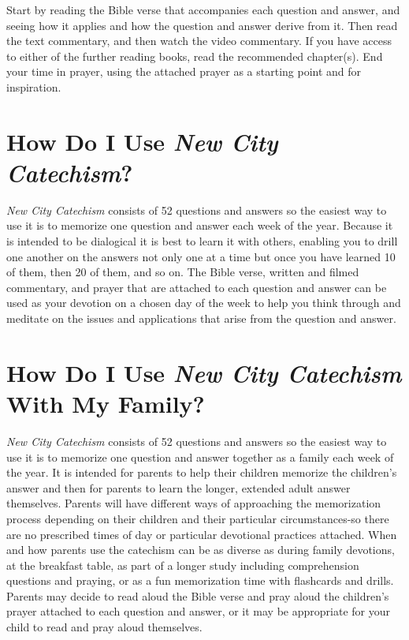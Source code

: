 Start by reading the Bible verse that accompanies each question and answer, and seeing how it applies and how the question and answer derive from it. Then read the text commentary, and then watch the video commentary. If you have access to either of the further reading books, read the recommended chapter(s). End your time in prayer, using the attached prayer as a starting point and for inspiration.

\section[How Do I Use {\em New City Catechism}?][Using the {\em Catechism}]{How Do I Use {\em New City Catechism}?}

\emph{New City Catechism}\/ consists of 52 questions and answers so the easiest way to use it is to memorize one question and answer each week of the year. Because it is intended to be dialogical it is best to learn it with others, enabling you to drill one another on the answers not only one at a time but once you have learned 10 of them, then 20 of them, and so on. The Bible verse, written and filmed commentary, and prayer that are attached to each question and answer can be used as your devotion on a chosen day of the week to help you think through and meditate on the issues and applications that arise from the question and answer.

\section[How Do I Use {\em New City Catechism}\/ With My Family?][{\em New City Catechism}\/ With A Family]{How Do I Use {\em New City Catechism}\/ With My Family?}

\emph{New City Catechism}\/ consists of 52 questions and answers so the easiest way to use it is to memorize one question and answer together as a family each week of the year. It is intended for parents to help their children memorize the children's answer and then for parents to learn the longer, extended adult answer themselves. Parents will have different ways of approaching the memorization process depending on their children and their particular circumstances-so there are no prescribed times of day or particular devotional practices attached. When and how parents use the catechism can be as diverse as during family devotions, at the breakfast table, as part of a longer study including comprehension questions and praying, or as a fun memorization time with flashcards and drills. Parents may decide to read aloud the Bible verse and pray aloud the children's prayer attached to each question and answer, or it may be appropriate for your child to read and pray aloud themselves.

